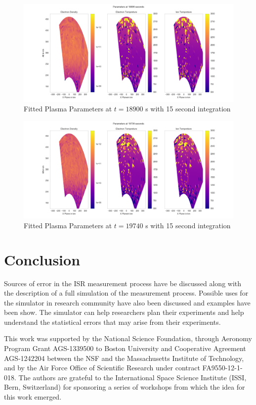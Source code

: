 \documentclass[draft,ras]{agutex}
\begin{document}
\begin{article}
\begin{figure}[!t]
\centering
\includegraphics[width=5in]{0900_15_int}
\caption{Fitted Plasma Parameters at $t=18900$ s with 15 second integration}
\label{fig:f15plparamst60}
\end{figure}


\begin{figure}[!t]
\centering
\includegraphics[width=5in]{1740_15_int}
\caption{Fitted Plasma Parameters at $t=19740$ s with 15 second integration}
\label{fig:f15plparamst120}
\end{figure}

\section{Conclusion}
Sources of error in the ISR measurement process have be discussed along with the description of a full simulation of the measurement process. Possible uses for the simulator in research community have also been discussed and examples have been show. The simulator can help researchers plan their experiments and help understand the statistical errors that may arise from their experiments. 

\begin{acknowledgments}
This work was supported by the National Science Foundation, through Aeronomy Program Grant AGS-1339500 to Boston University and Cooperative Agreement AGS-1242204 between the NSF and the Massachusetts Institute of Technology, and by the Air Force Office of Scientific Research under contract FA9550-12-1-018.   The authors are grateful to the International Space Science Institute (ISSI, Bern, Switzerland) for sponsoring a series of workshops from which the idea for this work emerged. 


\end{acknowledgments}
\end{article}
\end{document}
